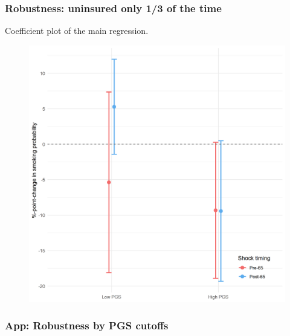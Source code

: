 \documentclass[10pt,compress,xcolor=dvipsnames,aspectratio=169]{beamer}    %
\newcounter{ex}
\newcommand{\1}[1]{\mathrm{1\hspace*{-2.5pt}l}[#1]}	%
\begin{document}
\begin{frame}
\frametitle{Robustness: uninsured only 1/3 of the time}
Coefficient plot of the main regression.
\begin{figure}[hbtp]

\centering
\includegraphics[height=0.8\textheight]{../../3_output/shock_effects/robustness_607033_cv.png}
\label{fig:coeffplot33unins}
\end{figure}
\hyperlink{frame:robustness}{}
\end{frame}

\subsubsection{App: Robustness by PGS cutoffs}
%
%
%
%
\end{document}
